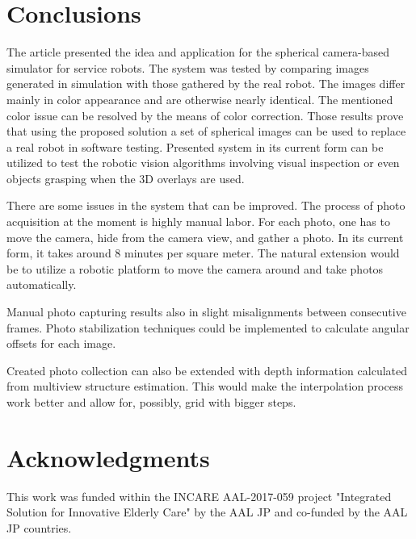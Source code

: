\documentclass{svproc}
\begin{document}
\section{Conclusions}

The article presented the idea and application for the spherical camera-based 
simulator for service robots. The system was tested by comparing images generated in simulation
with those gathered by the real robot. The images differ mainly in color appearance 
and are otherwise nearly identical. The mentioned color issue can be resolved by the 
means of color correction. Those results prove that using the proposed solution a set 
of spherical images can be used to replace a real robot in software testing.
Presented system in its current form can be utilized to test the robotic vision algorithms
involving visual inspection \cite{mmar_winiarski_automated-2016} or even objects
grasping \cite{seredynski2016fast} when the 3D overlays are used.

There are some issues in the system that can be improved. The process of photo acquisition
at the moment is highly manual labor. For each photo, one has to move the camera, hide from
the camera view, and gather a photo. In its current form, it takes around 8 minutes per square meter.
The natural extension would be to utilize a robotic platform to move the camera around and
take photos automatically.

Manual photo capturing results also in slight misalignments between consecutive frames.
Photo stabilization techniques could be implemented to calculate angular offsets for each
image.

Created photo collection can also be extended with depth information calculated from multiview
structure estimation. This would make the interpolation process work better and allow for, 
possibly, grid with bigger steps.

\section*{Acknowledgments}
\label{sec:acknowledgments}
This work was funded within the INCARE AAL-2017-059 project "Integrated Solution for Innovative Elderly
Care" by the AAL JP and co-funded by the AAL JP countries.

 

\end{document}
